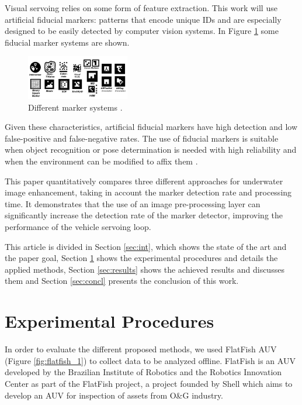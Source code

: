 \documentclass[conference, letterpaper]{IEEEtran}
\begin{document}
Visual servoing relies on some form of feature extraction. This work will use
artificial fiducial markers: patterns that encode
unique IDs and are especially designed to be easily detected by computer vision
systems. In Figure \ref{fig:marker_systems} some fiducial marker systems are
shown.

\begin{figure}[!ht]
	\centering
    \includegraphics[width=0.40\textwidth]{./fig/marker_systems.png}
    \caption[Different marker systems]{Different marker systems \cite{Fiala2010}.}
	\label{fig:marker_systems}
\end{figure}

Given these characteristics, artificial fiducial markers have high detection
and low false-positive and false-negative rates. The use of fiducial markers is
suitable when object recognition or pose determination is needed with high
reliability and when the environment can be modified to affix them \cite{Fiala2010}. 

This paper quantitatively compares three different approaches for underwater
image enhancement, taking in account the marker detection rate and processing
time. It demonstrates that the use of an image pre-processing layer can significantly
increase the detection rate of the marker detector, improving the performance
of the vehicle servoing loop.

This article is divided in Section \ref{sec:int}, which shows the state of the art
and the paper goal, Section \ref{sec:exp_proced} shows the experimental
procedures and details the applied methods, Section \ref{sec:results} shows the
achieved results and discusses them and Section \ref{sec:concl} presents the
conclusion of this work.

\section{Experimental Procedures} \label{sec:exp_proced}

In order to evaluate the different proposed methods, we used FlatFish AUV (Figure
\ref{fig:flatfish_1}) \cite{flatfish_jan} to collect data to be analyzed
offline. FlatFish is an AUV developed by the Brazilian Institute of Robotics
and the Robotics Innovation Center as part of the FlatFish project, a project
founded by Shell which aims to develop an AUV for inspection of assets from O\&G industry.
\end{document}
